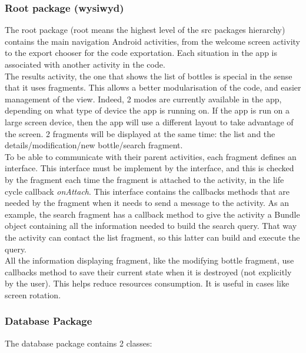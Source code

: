 \subsubsection{Root package (wysiwyd)}

The root package (root means the highest level of the src packages hierarchy) contains the main navigation Android activities, from the welcome screen activity to the export chooser for the code exportation. Each situation in the app is associated with another activity in the code.\\

The results activity, the one that shows the list of bottles is special in the sense that it uses fragments. This allows a better modularisation of the code, and easier management of the view. Indeed, 2 modes are currently available in the app, depending on what type of device the app is running on. If the app is run on a large screen device, then the app will use a different layout to take advantage of the screen. 2 fragments will be displayed at the same time: the list and the details/modification/new bottle/search fragment.\\

To be able to communicate with their parent activities, each fragment defines an interface. This interface must be implement by the interface, and this is checked by the fragment each time the fragment is attached to the activity, in the life cycle callback \emph{onAttach}. This interface contains the callbacks methods that are needed by the fragment when it needs to send a message to the activity. As an example, the search fragment has a callback method to give the activity a Bundle object containing all the information needed to build the search query. That way the activity can contact the list fragment, so this latter can build and execute the query.\\

All the information displaying fragment, like the modifying bottle fragment, use callbacks method to save their current state when it is destroyed (not explicitly by the user). This helps reduce resources consumption. It is useful in cases like screen rotation.

\subsubsection{Database Package}

The database package contains 2 classes:


